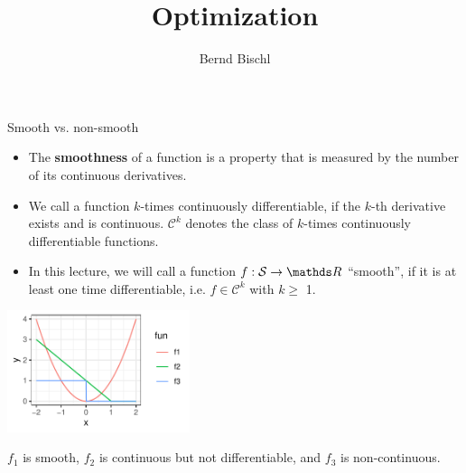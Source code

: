 





\newcommand{\titlefigure}{figure_man/differentiability_multivariate.png}
\newcommand{\learninggoals}{
\item Definition of Smoothness
\item Uni- \& Multivariate Differentiation}



\title{Optimization}
\author{Bernd Bischl}
\date{}



\sloppy


\begin{vbframe}{Smooth vs. non-smooth}

\begin{itemize}
\item The \textbf{smoothness} of a function is a property that is measured by the number of its continuous derivatives. 
\item We call a function $k$-times continuously differentiable, if the $k$-th derivative exists and is continuous. $\mathcal{C}^k$ denotes the class of $k$-times continuously differentiable functions.
\item In this lecture, we will call a function $f: \mathcal{S} \to \R$ \enquote{smooth}, if it is at least one time differentiable, i.e. $f \in \mathcal{C}^k$ with $k \geq$ 1. 
 
\end{itemize}


\begin{center}
\includegraphics[width = 0.4\textwidth]{figure_man/hinge_vs_l2.pdf} \\ 
\begin{footnotesize}
$f_1$ is smooth, $f_2$ is continuous but not differentiable, and $f_3$ is non-continuous. 
\end{footnotesize}
\end{center}


\end{vbframe}

